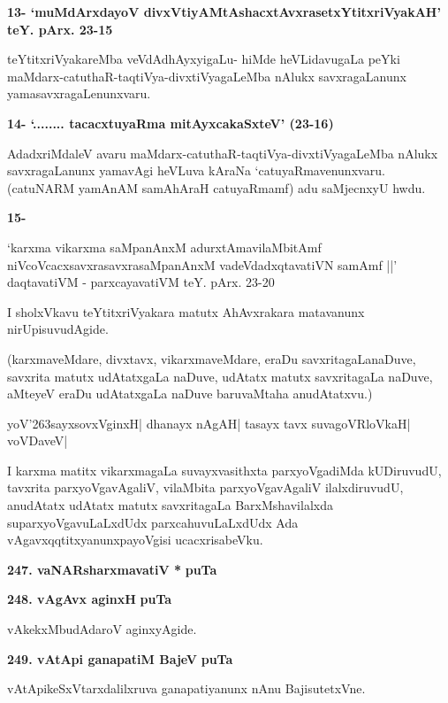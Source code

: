 \medskip
\noindent
\textbf{13- `muMdArxdayoV divxVtiyAMtAshacxtAvxrasetxYtitxriVyakAH' teY. pArx. 23-15}

\smallskip
teYtitxriVyakareMba veVdAdhAyxyigaLu- hiMde heVLidavugaLa peYki maMdarx-\-catuthaR-taqtiVya-divxtiV\-ya\-gaLeMba nAlukx savxragaLanunx yamasavxragaLenunxvaru.

\medskip
\noindent
\textbf{14- `........ tacacxtuyaRma mitAyxcakaSxteV' (23-16)}

\smallskip
AdadxriMdaleV avaru maMdarx-catuthaR-taqtiVya-divxtiVyagaLeMba nAlukx savxragaLanunx yamavAgi heVLuva kAraNa `catuyaRmavenunxvaru. (catuNARM yamAnAM samAhAraH catuyaR\-mamf) adu saMjecnxyU hwdu.

\medskip
\noindent
\textbf{15-}

\begin{shloka}
`karxma vikarxma saMpanAnxM adurxtAmavilaMbitAmf\\
niVcoVcacxsavxrasavxrasaMpanAnxM vadeVdadxqtavatiVN samAmf ||'\\
daqtavatiVM - parxcayavatiVM teY. pArx. 23-20
\end{shloka}

I sholxVkavu teYtitxriVyakara matutx AhAvxrakara matavanunx nirUpisuvudAgide.

(karxmaveMdare, divxtavx, vikarxmaveMdare, eraDu savxritagaLanaDuve, savxrita matutx udAtatxgaLa naDuve, udAtatx matutx savxritagaLa naDuve, aMteyeV eraDu udAtatxgaLa naDuve baruvaMtaha anudAtatxvu.)

\begin{shloka}
yoV\char'263sayxsovxVginxH| dhanayx nAgAH| tasayx tavx suvagoVRloVkaH| voVDaveV|
\end{shloka}

I karxma matitx vikarxmagaLa suvayxvasithxta parxyoVgadiMda kUDiruvudU, tavxrita parxyoVgavAgaliV, vilaM\-bita parxyoVgavAgaliV ilalxdiruvudU, anudAtatx udAtatx matutx savxritagaLa BarxMshavilalxda suparx\-yoVga\-vuLaLxdUdx parxcahuvuLaLxdUdx Ada vAgavxqqtitxyanunxpayoVgisi ucacxrisabeVku.

\medskip
\noindent
\textbf{247. vaNARsharxmavatiV *} \hfill{\bf puTa \pageref{95}}

\medskip
\noindent
\textbf{248. vAgAvx aginxH} \hfill{\bf puTa \pageref{212}}

\smallskip
vAkekxMbudAdaroV aginxyAgide.

\medskip
\noindent
\textbf{249. vAtApi ganapatiM BajeV} \hfill{\bf puTa \pageref{124}}

\smallskip
vAtApikeSxVtarxdalilxruva ganapatiyanunx nAnu BajisutetxVne.

